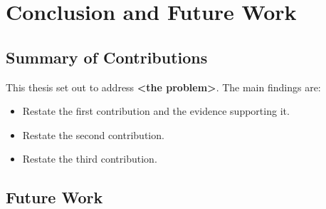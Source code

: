 \chapter{Conclusion and Future Work}
\label{ch:conclusion}

\section{Summary of Contributions}
\label{sec:summary}

This thesis set out to address \textbf{<the problem>}. The main findings are:
\begin{itemize}
    \item Restate the first contribution and the evidence supporting it.
    \item Restate the second contribution.
    \item Restate the third contribution.
\end{itemize}

\section{Future Work}
\label{sec:future-work}
\lipsum[10]
